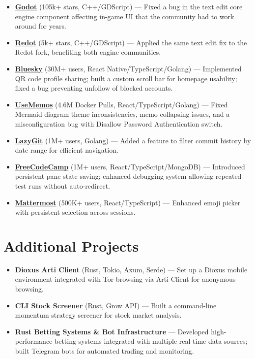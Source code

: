 \documentclass[11pt,letterpaper]{article}
\newcommand{\bigbullet}[1]{
  \begin{itemize}[leftmargin=1.2em, itemsep=-1pt, topsep=-2pt, parsep=0pt, partopsep=0pt]
    \item \small{#1}
  \end{itemize}
}
\begin{document}
\bigbullet{\href{https://github.com/godotengine/godot}{\textbf{Godot}} (105k+ stars, C++/GDScript) --- Fixed a bug in the text edit core engine component affecting in-game UI that the community had to work around for years.}
\vspace{1pt}
\bigbullet{\href{https://github.com/Redot-Engine/redot-engine}{\textbf{Redot}} (5k+ stars, C++/GDScript) --- Applied the same text edit fix to the Redot fork, benefiting both engine communities.}
\vspace{1pt}
\bigbullet{\href{https://github.com/bluesky-social/social-app}{\textbf{Bluesky}} (30M+ users, React Native/TypeScript/Golang) --- Implemented QR code profile sharing; built a custom scroll bar for homepage usability; fixed a bug preventing unfollow of blocked accounts.}
\vspace{1pt}
\bigbullet{\href{https://github.com/usememos/memos}{\textbf{UseMemos}} (4.6M Docker Pulls, React/TypeScript/Golang) --- Fixed Mermaid diagram theme inconsistencies, memo collapsing issues, and a misconfiguration bug with Disallow Password Authentication switch.}
\vspace{1pt}
\bigbullet{\href{https://github.com/jesseduffield/lazygit}{\textbf{LazyGit}} (1M+ users, Golang) --- Added a feature to filter commit history by date range for efficient navigation.}
\vspace{1pt}
\bigbullet{\href{https://github.com/freeCodeCamp/freeCodeCamp}{\textbf{FreeCodeCamp}} (1M+ users, React/TypeScript/MongoDB) --- Introduced persistent pane state saving; enhanced debugging system allowing repeated test runs without auto-redirect.}
\vspace{1pt}
\bigbullet{\href{https://github.com/mattermost/mattermost}{\textbf{Mattermost}} (500K+ users, React/TypeScript) --- Enhanced emoji picker with persistent selection across sessions.}

\section{Additional Projects}

\bigbullet{\textbf{Dioxus Arti Client} (Rust, Tokio, Axum, Serde) --- Set up a Dioxus mobile environment integrated with Tor browsing via Arti Client for anonymous browsing.}
\bigbullet{\textbf{CLI Stock Screener} (Rust, Grow API) --- Built a command-line momentum strategy screener for stock market analysis.}
\bigbullet{\textbf{Rust Betting Systems \& Bot Infrastructure} --- Developed high-performance betting systems integrated with multiple real-time data sources; built Telegram bots for automated trading and monitoring.}
\end{document}
